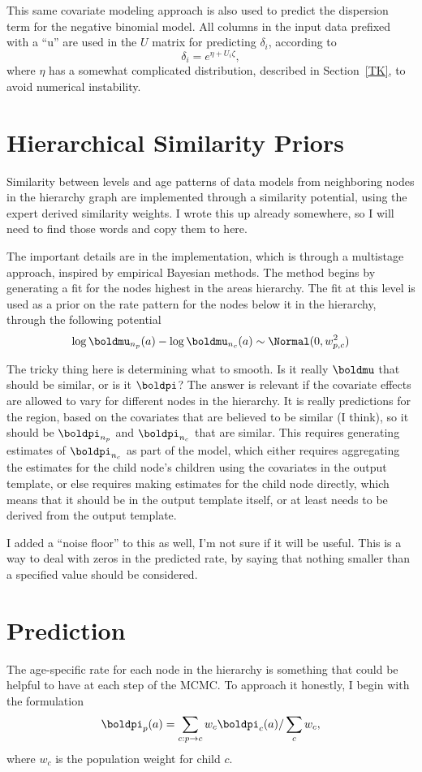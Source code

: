 This same covariate modeling approach is also used to predict the
dispersion term for the negative binomial model.  All columns in the
input data prefixed with a ``u'' are used in the $U$ matrix for
predicting $\delta_i$, according to
\[
\delta_i = e^{\eta + U_i\zeta},
\]
where $\eta$ has a somewhat complicated distribution, described in
Section~\ref{TK}, to avoid numerical instability.


\section{Hierarchical Similarity Priors}
Similarity between levels and age patterns of data models from
neighboring nodes in the hierarchy graph are implemented through a
similarity potential, using the expert derived similarity weights.  I
wrote this up already somewhere, so I will need to find those words
and copy them to here.

The important details are in the implementation, which is through a
multistage approach, inspired by empirical Bayesian methods.  The
method begins by generating a fit for the nodes highest in the areas
hierarchy.  The fit at this level is used as a prior on the rate
pattern for the nodes below it in the hierarchy, through the following
potential
\[
\log \boldmu_{n_p}(a) - \log \boldmu_{n_c}(a) \sim \Normal(0,
w_{p,c}^2)
\]

The tricky thing here is determining what to smooth.  Is it really
$\boldmu$ that should be similar, or is it $\boldpi$?  The answer is
relevant if the covariate effects are allowed to vary for different
nodes in the hierarchy.  It is really predictions for the region,
based on the covariates that are believed to be similar (I think), so
it should be $\boldpi_{n_p}$ and $\boldpi_{n_c}$ that are similar.
This requires generating estimates of $\boldpi_{n_c}$ as part of the
model, which either requires aggregating the estimates for the child
node's children using the covariates in the output template, or else
requires making estimates for the child node directly, which means
that it should be in the output template itself, or at least needs to
be derived from the output template.

I added a ``noise floor'' to this as well, I'm not sure if it will be
useful.  This is a way to deal with zeros in the predicted rate, by
saying that nothing smaller than a specified value should be
considered.

\section{Prediction}
The age-specific rate for each node in the hierarchy is something that
could be helpful to have at each step of the MCMC.  To approach it
honestly, I begin with the formulation
\[
\boldpi_{p}(a) = \sum_{c: p\rightarrow c} w_c \boldpi_c(a) / \sum_{c}
w_c,
\]
where $w_c$ is the population weight for child $c$.

